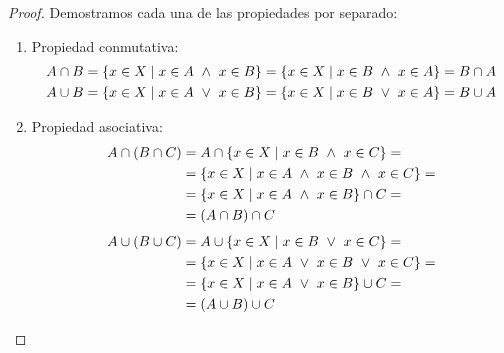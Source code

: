 \begin{proof}
    Demostramos cada una de las propiedades por separado:
    \begin{enumerate}
        \item Propiedad conmutativa:
        \begin{gather*}
            A \cap B = \{x \in X \mid x \in A \ \land \  x \in B \} = \{x \in X \mid x \in B \ \land \  x \in A \} = B \cap A \\
            A \cup B = \{x \in X \mid x \in A \ \lor \  x \in B\} = \{x \in X \mid x \in B \ \lor \  x \in A\} = B \cup A
        \end{gather*}
        \item Propiedad asociativa:
        \begin{equation*}
            \begin{split}
                A \cap (B \cap C) &= A \cap \{x \in X \mid x \in B \ \land \  x \in C \} =\\
                & =\{x \in X \mid x \in A \ \land \  x \in B \ \land \  x \in C\} = \\
                & =\{x \in X \mid x \in A \ \land \  x \in B\} \cap C =\\
                & = (A \cap B) \cap C
            \end{split}
        \end{equation*}
        \begin{equation*}
            \begin{split}
                A \cup (B \cup C) &= A \cup \{x \in X \mid x \in B \ \lor \  x \in C \} =\\
                & =\{x \in X \mid x \in A \ \lor \  x \in B \ \lor \  x \in C\} =\\
                & =\{x \in X \mid x \in A \ \lor \  x \in B\} \cup C =\\
                & =(A \cup B) \cup C
            \end{split}
        \end{equation*}
        

\end{enumerate}
\end{proof}
